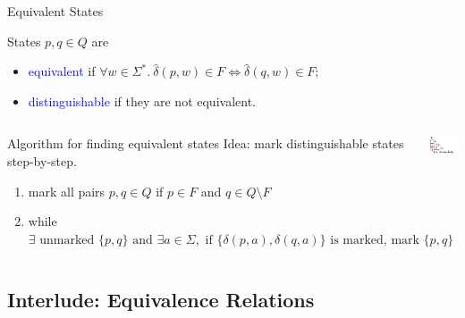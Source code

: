 \documentclass{beamer}
\def\b{\textcolor{blue}}
\begin{document}
\begin{frame}{Equivalent States}
    \begin{definition}
        States $p, q \in Q$ are
        \begin{itemize}
            \item \b{equivalent} if $\forall w \in \Sigma^*.\ \hat{\delta}(p, w) \in F \iff \hat{\delta}(q, w) \in F$\pause;
            \item \b{distinguishable} if they are not equivalent.
        \end{itemize}
    \end{definition}\pause
    \begin{columns}
        \begin{block}{Algorithm for finding equivalent states}
            Idea: mark distinguishable states step-by-step.\pause
            \begin{enumerate}
                \item mark all pairs $p, q \in Q$ if $p \in F$ and $q \in Q \setminus F$\pause
                \item while $\exists \text{ unmarked } \{p, q\} \text{ and } \exists a \in \Sigma, \text{ if } \{\delta(p, a), \delta(q, a)\} \text{ is marked, mark } \{p, q\}$
            \end{enumerate}
        \end{block}
        \centering
        \includegraphics[width=\textwidth]{materials/images/equivalent_states.png}
    \end{columns}
\end{frame}

\subsection{Interlude: Equivalence Relations}
\end{document}
